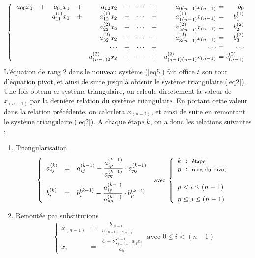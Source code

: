 \begin{equation}\label{eq5}
\left\{
\begin{array}{rcrcrcrcr@{\ =\ }r}
a_{00}x_0 &+& a_{01}x_1       &+& a_{02}x_2       &+& \cdots &+& a_{0(n-1)}x_{(n-1)}       & b_0\\
          & & a^{(1)}_{11}x_1 &+& a^{(1)}_{12}x_2 &+& \cdots &+& a^{(1)}_{1(n-1)}x_{(n-1)} & b^{(1)}_1\\
          & &                 & & a^{(2)}_{22}x_2 &+& \cdots &+& a^{(2)}_{2(n-1)}x_{(n-1)} & b^{(2)}_2\\
          & &                 & & a^{(2)}_{32}x_2 &+& \cdots &+& a^{(2)}_{3(n-1)}x_{(n-1)} & b^{(2)}_3\\
          & &                 & & \cdots          &+& \cdots &+& \cdots                    & \cdots\\
          & &                 & & a^{(2)}_{(n-1)2}x_2 &+& \cdots &+& a^{(2)}_{(n-1)(n-1)}x_{(n-1)}   & b^{(2)}_{(n-1)}
\end{array}
\right.
\end{equation}
L'équation de rang 2 dans le nouveau système (\ref{eq5}) fait office à son tour d'équation
pivot, et ainsi de suite jusqu'à obtenir le système triangulaire (\ref{eq2}).
Une fois obtenu ce système triangulaire, on calcule directement
la valeur de $x_{(n-1)}$ par la dernière relation du système triangulaire. 
En portant cette valeur dans la relation précédente, on calculera
$x_{(n-2)}$, et ainsi de suite en remontant le système triangulaire (\ref{eq2}).
A chaque étape $k$, on a donc les relations suivantes :
\begin{enumerate}
\item {Triangularisation}
	$$\left\{
	\begin{array}{lcl}
	a_{ij}^{(k)} & = & \displaystyle a_{ij}^{(k-1)} - \frac{a_{ip}^{(k-1)}}{a_{pp}^{(k-1)}}\cdot
	a_{pj}^{(k-1)} \\[5mm]
	b_i^{(k)}    & = & \displaystyle b_i^{(k-1)} - \frac{a_{ip}^{(k-1)}}{a_{pp}^{(k-1)}}\cdot
	b_p^{(k-1)}
	\end{array}
	\right.\mbox{\footnotesize\ avec\ }
	\left\{
	\begin{array}{l}
	k\ :\ \mbox{\footnotesize étape}\\
	p\ : \ \mbox{\footnotesize rang du pivot}\\[5mm]
	p < i \leq (n-1) \\[2mm]
	p \leq j \leq (n-1)
	\end{array}
	\right.$$
\item {Remontée par substitutions} 
	$$\left\{
	\begin{array}{lcl}
	x_{(n-1)} & = & \displaystyle\frac{b_{(n-1)}}{a_{(n-1)(n-1)}}\\[5mm]
	x_i       & = & \displaystyle\frac{\displaystyle b_{i} - 
	\sum_{j=i+1}^{n-1} a_{ij}x_j}{a_{ii}} 
	\end{array}
	\right.
	\mbox{\ avec\ } 0 \leq i < (n-1)$$
\end{enumerate}


